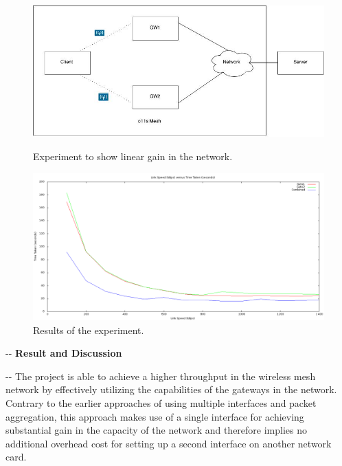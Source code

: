 \documentclass[12pt]{article}
\makeatletter
\newenvironment{indentation}[3]%
	{\par\setlength{\parindent}{#3}
	\setlength{\leftmargin}{#1}       \setlength{\rightmargin}{#1}%
	\advance\linewidth -\leftmargin       \advance\linewidth -\rightmargin%
	\advance\@totalleftmargin\leftmargin  \@setpar{{\@@par}}%
	\parshape 1\@totalleftmargin \linewidth\ignorespaces}{\par}%
\makeatother
\begin{document}
\begin{figure}[t]
  \centering
    \includegraphics[scale=0.60]{ExperimentLayout}
    \caption{Experiment to show linear gain in the network.}
    \label{Diagram: Experiment layout}
    \vspace{0.1cm}
    \centering
    \includegraphics[scale=0.4]{ExperimentGraph}
    \caption{Results of the experiment.}
    \label{Graph: Result}
\end{figure}

\begin{indentation}{0pt}{0pt}{0pt}
\vspace{200cm}  
\textbf{{{\Large Result and Discussion}}}
\end{indentation}
\vspace{0.5cm}

\begin{indentation}{0pt}{0pt}{0pt}
{\normalsize \hspace{1cm} The project is able to achieve a higher throughput in the wireless mesh network by effectively utilizing the capabilities of the gateways in the network. Contrary to the earlier approaches of using multiple interfaces and packet aggregation, this approach makes use of a single interface for achieving substantial gain in the capacity of the network and therefore implies no additional overhead cost for setting up a second interface on another network card.}
\end{indentation}
\end{document}
